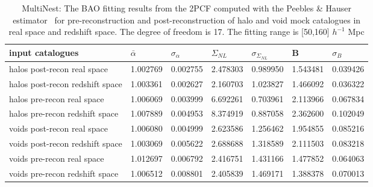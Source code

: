 \begin{table*}
\caption{MultiNest: The BAO fitting results from the 2PCF computed with the Peebles \& Hauser estimator~\cite{Peebles1974} for pre-reconstruction and  post-reconstruction of halo and void mock catalogues in real space and redshift space. The degree of freedom is 17. The fitting range is [50,160] $h^{-1}$ Mpc}
\label{tab:LS}
\begin{tabular}{lllllll}
\hline
input catalogues                &$\bar{\alpha}$&$\sigma_{\alpha}$&     $\Sigma_{NL}$ & $\sigma_{\Sigma_{NL}}$&      B   & $\sigma_B$  \\
\hline
halos post-recon real space     & 1.002769 & 0.002755 & 2.478303 & 0.989950 & 1.543481 & 0.039426 \\
halos post-recon redshift space & 1.003361 & 0.002627 & 2.160703 & 1.023827 & 1.466092 & 0.036322 \\
halos pre-recon real space      & 1.006069 & 0.003999 & 6.692261 & 0.703961 & 2.113966 & 0.067834 \\
halos pre-recon redshift space  & 1.007889 & 0.004953 & 8.374919 & 0.887058 & 2.362600 & 0.102049 \\
\hline
voids post-recon real space     & 1.006080 & 0.004999 & 2.623586 & 1.256462 & 1.954855 & 0.085216 \\
voids post-recon redshift space & 1.003069 & 0.005622 & 2.688688 & 1.318589 & 2.111503 & 0.083218 \\
voids pre-recon real space      & 1.012697 & 0.006792 & 2.416751 & 1.431166 & 1.477852 & 0.064063 \\
voids pre-recon redshift space  & 1.006512 & 0.008801 & 2.405839 & 1.469171 & 1.388378 & 0.070013 \\
\hline
\end{tabular}
\end{table*}

